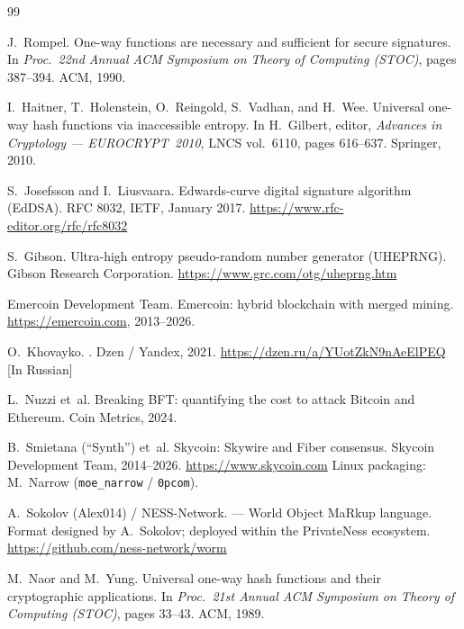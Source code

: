 \documentclass[11pt,a4paper]{article}
\theoremstyle{definition}
\begin{document}

\begin{thebibliography}{99}

J.~Rompel.
\newblock One-way functions are necessary and sufficient for secure
  signatures.
\newblock In {\em Proc.\ 22nd Annual ACM Symposium on Theory of
  Computing (STOC)}, pages 387--394. ACM, 1990.

I.~Haitner, T.~Holenstein, O.~Reingold, S.~Vadhan, and H.~Wee.
\newblock Universal one-way hash functions via inaccessible entropy.
\newblock In H.~Gilbert, editor, {\em Advances in Cryptology ---
  EUROCRYPT~2010}, LNCS vol.~6110, pages 616--637. Springer, 2010.

S.~Josefsson and I.~Liusvaara.
\newblock Edwards-curve digital signature algorithm ({EdDSA}).
\newblock RFC 8032, IETF, January 2017.
\newblock \url{https://www.rfc-editor.org/rfc/rfc8032}

S.~Gibson.
\newblock Ultra-high entropy pseudo-random number generator ({UHEPRNG}).
\newblock Gibson Research Corporation.
\newblock \url{https://www.grc.com/otg/uheprng.htm}

Emercoin Development Team.
\newblock Emercoin: hybrid blockchain with merged mining.
\newblock \url{https://emercoin.com}, 2013--2026.

O.~Khovayko.
.
\newblock Dzen / Yandex, 2021.
\newblock \url{https://dzen.ru/a/YUotZkN9nAeElPEQ} [In Russian]

L.~Nuzzi et~al.
\newblock Breaking {BFT}: quantifying the cost to attack {Bitcoin}
  and {Ethereum}.
\newblock Coin Metrics, 2024.

B.~Smietana (``Synth'') et~al.
\newblock Skycoin: {Skywire} and {Fiber} consensus.
\newblock Skycoin Development Team, 2014--2026.
\newblock \url{https://www.skycoin.com}
\newblock Linux packaging: M.~Narrow (\texttt{moe\_narrow} /
  \texttt{0pcom}).

A.~Sokolov (Alex014) / {NESS-Network}.
 --- {W}orld {O}bject {Ma}R\-kup language.
\newblock Format designed by A.~Sokolov; deployed within the
  {PrivateNess} ecosystem.
\newblock \url{https://github.com/ness-network/worm}

M.~Naor and M.~Yung.
\newblock Universal one-way hash functions and their cryptographic
  applications.
\newblock In {\em Proc.\ 21st Annual ACM Symposium on Theory of
  Computing (STOC)}, pages 33--43. ACM, 1989.


\end{thebibliography}
\end{document}
